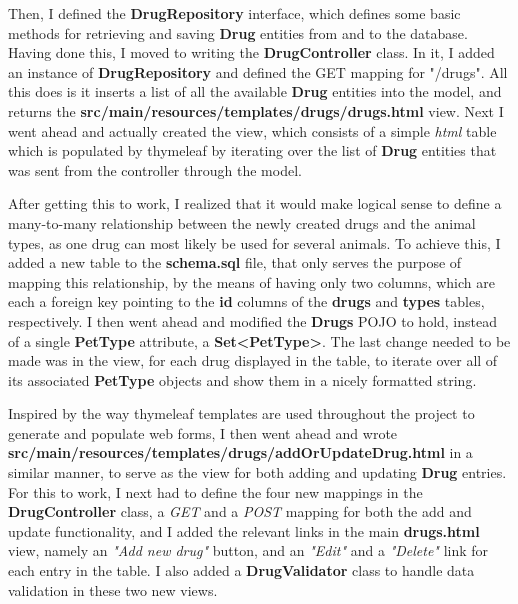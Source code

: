 \documentclass[12pt, a4paper]{article}
\begin{document}
Then, I defined the \textbf{DrugRepository} interface, which defines some basic methods for retrieving and saving \textbf{Drug} entities from and to the database. Having done this, I moved to writing the \textbf{DrugController} class. In it, I added an instance of \textbf{DrugRepository} and defined the GET mapping for "/drugs". All this does is it inserts a list of all the available \textbf{Drug} entities into the model, and returns the \textbf{src/main/resources/templates/drugs/drugs.html} view. Next I went ahead and actually created the view, which consists of a simple \textit{html} table which is populated by thymeleaf by iterating over the list of \textbf{Drug} entities that was sent from the controller through the model.

After getting this to work, I realized that it would make logical sense to define a many-to-many relationship between the newly created drugs and the animal types, as one drug can most likely be used for several animals. To achieve this, I added a new table to the \textbf{schema.sql} file, that only serves the purpose of mapping this relationship, by the means of having only two columns, which are each a foreign key pointing to the \textbf{id} columns of the \textbf{drugs} and \textbf{types} tables, respectively. I then went ahead and modified the \textbf{Drugs} POJO to hold, instead of a single \textbf{PetType} attribute, a \textbf{Set\textless PetType\textgreater}. The last change needed to be made was in the view, for each drug displayed in the table, to iterate over all of its associated \textbf{PetType} objects and show them in a nicely formatted string.

Inspired by the way thymeleaf templates are used throughout the project to generate and populate web forms, I then went ahead and wrote \textbf{src/main/resources/templates/drugs/addOrUpdateDrug.html} in a similar manner, to serve as the view for both adding and updating \textbf{Drug} entries. For this to work, I next had to define the four new mappings in the \textbf{DrugController} class, a \textit{GET} and a \textit{POST} mapping for both the add and update functionality, and I added the relevant links in the main \textbf{drugs.html} view, namely an \textit{"Add new drug"} button, and an \textit{"Edit"} and a \textit{"Delete"} link for each entry in the table. I also added a \textbf{DrugValidator} class to handle data validation in these two new views.
\end{document}
